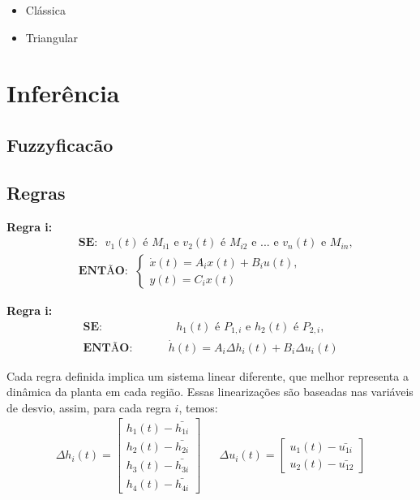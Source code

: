 	\begin{itemize}
		\item Clássica \\
		\item Triangular		
	\end{itemize}
	
	
\section{Inferência}

\subsection{Fuzzyficacão}

\subsection{Regras}
	
	\textbf{Regra i:}
	\begin{align}
		&\textbf{SE:} \text{ $v_1(t)$ é $M_{i1}$ e $v_2(t)$ é $M_{i2}$ e ... e $v_n(t)$ e $M_{in}$,} \\
		&\textbf{ENTÃO}: \ \ \begin{cases}
			\dot{x}(t) = A_ix(t) + B_iu(t),\\
			y(t) = C_ix(t)
		\end{cases}
	\label{eqRegraIGeral}
	\end{align}
	
	\textbf{Regra i:}
	\begin{align}
		\textbf{SE:}  \hspace{1cm} &\text{ $h_1(t)$ é $P_{1,i}$ e $h_2(t)$ é $P_{2,i}$,} \\
		\textbf{ENTÃO:} \hspace{1cm} & \dot{h}(t) =  A_i \Delta h_i(t) +  B_i \Delta u_i(t)
	\end{align}
	
	Cada regra definida implica um sistema linear diferente, que melhor representa a dinâmica da planta em cada região. Essas linearizações são baseadas nas variáveis de desvio, assim, para cada regra $i$, temos:
	\begin{align}
		\Delta h_i(t) =
		\begin{bmatrix}
			h_1(t) - \bar{h_{1i}} \\
			h_2(t) - \bar{h_{2i}} \\
			h_3(t) - \bar{h_{3i}} \\
			h_4(t) - \bar{h_{4i}}
		\end{bmatrix} 
		&&
		\Delta u_i(t) = 
		\begin{bmatrix}
			u_1(t) - \bar{u_{1i}} \\
			u_2(t) - \bar{u_{12}}
		\end{bmatrix}
	\end{align}	
	
